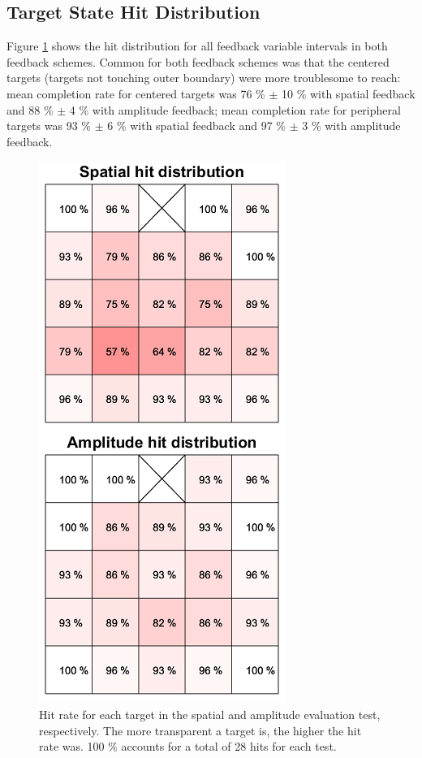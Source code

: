 \subsection{Target State Hit Distribution}
Figure \ref{fig:pa:hit_dist} shows the hit distribution for all feedback variable intervals in both feedback schemes. Common for both feedback schemes was that the centered  targets (targets not touching outer boundary) were more troublesome to reach: mean completion rate for centered targets was 76 \% $\pm$ 10 \% with spatial feedback and 88 \%  $\pm$ 4 \% with amplitude feedback; mean completion rate for peripheral targets was 93 \% $\pm$ 6 \% with spatial feedback and 97 \% $\pm$ 3 \% with amplitude feedback.
\begin{figure}[H]                 
	\includegraphics[width=.7\textwidth]{figures/hit_dist}
	\caption{Hit rate for each target in the spatial and amplitude evaluation test, respectively. The more transparent a target is, the higher the hit rate was. 100 $\%$ accounts for a total of 28 hits for each test.}
	\label{fig:pa:hit_dist} 
\end{figure}
